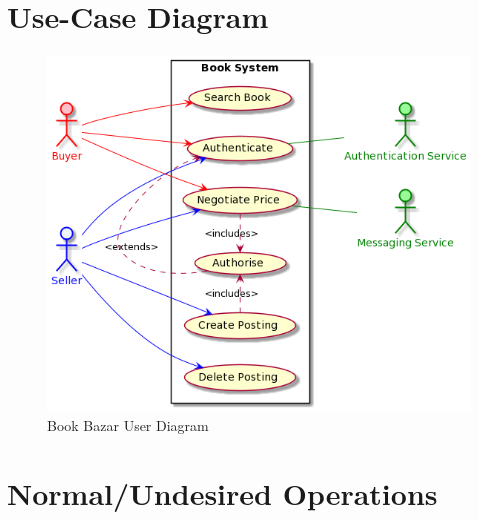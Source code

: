 \documentclass[fullpage]{article}
\begin{document}
\section{Use-Case Diagram}
\begin{figure}[h]
    \centering
    \includegraphics[width=1.05\textwidth]{b.png}
    \caption{Book Bazar User Diagram}
    \label{UserDiagram}
\end{figure}

\section{Normal/Undesired Operations}
\end{document}
